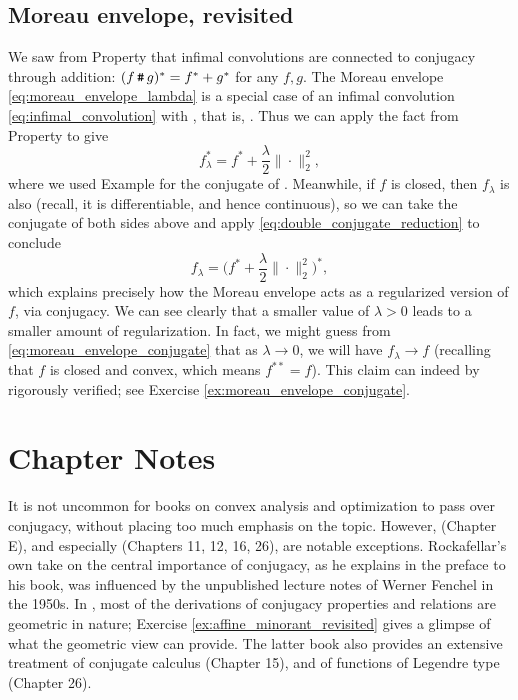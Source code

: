 \subsection{Moreau envelope, revisited}
\label{sec:moreau_revisited}

We saw from Property  that infimal
convolutions are connected to conjugacy through addition: $(f \operatorname{\texttt{\#}} g)^* =
f^* + g^*$ for any $f,g$. The Moreau envelope \eqref{eq:moreau_envelope_lambda}
is a special case of an infimal convolution \eqref{eq:infimal_convolution} with
, that is, . Thus we can apply the fact from
Property  to give 
\[
f_\lambda^* = f^* + \frac{\lambda}{2} \|\cdot\|_2^2,
\]
where we used Example  for the conjugate of
. Meanwhile, if $f$ is closed, then
$f_\lambda$ is also (recall, it is differentiable, and hence continuous), so we
can take the conjugate of both sides above and apply
\eqref{eq:double_conjugate_reduction} to conclude   
\begin{equation}
\label{eq:moreau_envelope_conjugate}
f_\lambda = \bigg( f^* + \frac{\lambda}{2} \|\cdot\|_2^2 \bigg)^*,
\end{equation}
which explains precisely how the Moreau envelope acts as a regularized version 
of $f$, via conjugacy. We can see clearly that a smaller value of $\lambda>0$
leads to a smaller amount of regularization. In fact, we might guess from 
\eqref{eq:moreau_envelope_conjugate} that as $\lambda \to 0$, we will have  
$f_\lambda\to f$ (recalling that $f$ is closed and convex, which means $f^{**} =
f$). This claim can indeed by rigorously verified; see Exercise 
\ref{ex:moreau_envelope_conjugate}.  

\SkipTocEntry\section*{Chapter Notes}

It is not uncommon for books on convex analysis and optimization to pass over
conjugacy, without placing too much emphasis on the
topic. However, \cite{hiriartUrruty2001fundamentals} (Chapter E), and
especially \cite{rockafellar1970convex} (Chapters 11, 12, 16, 26), are notable 
exceptions. Rockafellar's own take on the central importance of conjugacy, as he 
explains in the preface to his book, was influenced by the unpublished lecture
notes of Werner Fenchel in the 1950s. In \cite{rockafellar1970convex}, most of
the derivations of conjugacy properties and relations are geometric in nature; 
Exercise \ref{ex:affine_minorant_revisited} gives a glimpse of what the
geometric view can provide. The latter book also provides an extensive treatment
of conjugate calculus (Chapter 15), and of functions of Legendre type (Chapter
26). 

